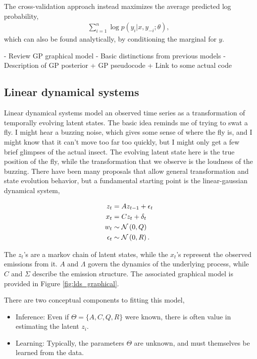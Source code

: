 \documentclass{article}
\begin{document}
The cross-validation approach instead maximizes the average predicted log probability,
\begin{align*}
\sum_{i = 1}^{n} \log p\left(y_{i} \vert x, y_{-i}; \theta\right),
\end{align*}
which can also be found analytically, by conditioning the marginal for $y$.

- Review GP graphical model
- Basic distinctions from previous models
- Description of GP posterior
  + GP pseudocode
  + Link to some actual code

\subsection{Linear dynamical systems}
\label{subsec:linear_dynamical_systems}

Linear dynamical systems model an observed time series as a transformation of
temporally evolving latent states. The basic idea reminds me of trying to swat a
fly. I might hear a buzzing noise, which gives some sense of where the fly is,
and I might know that it can't move too far too quickly, but I might only get a
few brief glimpses of the actual insect. The evolving latent state here is the
true position of the fly, while the transformation that we observe is the
loudness of the buzzing. There have been many proposals that allow general
transformation and state evolution behavior, but a fundamental starting point is
the linear-gaussian dynamical system,

\begin{align*}
  z_{t} &= A z_{t - 1} + \epsilon_{t} \\
  x_{t} &= C z_{t} + \delta_{t} \\
  w_{t} &\sim \mathcal{N}\left(0, Q\right) \\
  \epsilon_{t} &\sim \mathcal{N}\left(0, R\right).
\end{align*}

The $z_{t}$'s are a markov chain of latent states, while the $x_{t}$'s represent
the observed emissions from it. $A$ and $\Lambda$ govern the dynamics of the
underlying process, while $C$ and $\Sigma$ describe the emission structure. The
associated graphical model is provided in Figure \ref{fig:lds_graphical}.

There are two conceptual components to fitting this model,

\begin{itemize}
\item Inference: Even if $\Theta = \{A, C, Q, R\}$ were known, there
  is often value in estimating the latent $z_{i}$.
\item Learning: Typically, the parameters $\Theta$ are unknown, and must
  themselves be learned from the data.
\end{itemize}
\end{document}

